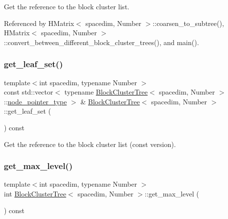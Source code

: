 Get the reference to the block cluster list. 

Referenced by H\+Matrix$<$ spacedim, Number $>$\+::coarsen\+\_\+to\+\_\+subtree(), H\+Matrix$<$ spacedim, Number $>$\+::convert\+\_\+between\+\_\+different\+\_\+block\+\_\+cluster\+\_\+trees(), and main().

\mbox{\label{classBlockClusterTree_a38c3d1ad3aa983ea1d0b711914664b4c}} 
\subsubsection{\texorpdfstring{get\+\_\+leaf\+\_\+set()}{get\_leaf\_set()}\hspace{0.1cm}{\footnotesize\ttfamily [2/2]}}
{\footnotesize\ttfamily template$<$int spacedim, typename Number $>$ \\
const std\+::vector$<$ typename \hyperlink{classBlockClusterTree}{Block\+Cluster\+Tree}$<$ spacedim, Number $>$\+::\hyperlink{classTreeNode}{node\+\_\+pointer\+\_\+type} $>$ \& \hyperlink{classBlockClusterTree}{Block\+Cluster\+Tree}$<$ spacedim, Number $>$\+::get\+\_\+leaf\+\_\+set (\begin{DoxyParamCaption}{ }\end{DoxyParamCaption}) const}

Get the reference to the block cluster list (const version). \mbox{\label{classBlockClusterTree_a404693ef7dfdbc383705c38105c75e14}} 
\subsubsection{\texorpdfstring{get\+\_\+max\+\_\+level()}{get\_max\_level()}}
{\footnotesize\ttfamily template$<$int spacedim, typename Number $>$ \\
int \hyperlink{classBlockClusterTree}{Block\+Cluster\+Tree}$<$ spacedim, Number $>$\+::get\+\_\+max\+\_\+level (\begin{DoxyParamCaption}{ }\end{DoxyParamCaption}) const}

